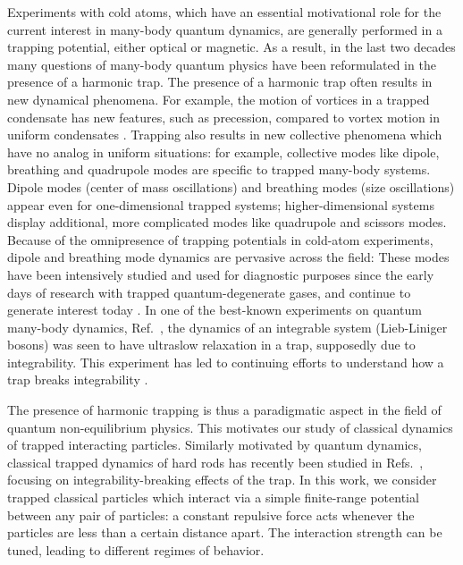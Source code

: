 \documentclass[a4paper, onecolumn]{revtex4-1}
\begin{document}
Experiments with cold atoms, which have an essential motivational role for the current interest in
many-body quantum dynamics, are generally performed in a trapping potential, either optical or
magnetic.  As a result, in the last two decades many questions of many-body quantum physics have
been reformulated in the presence of a harmonic trap.  The presence of a harmonic trap often results
in new dynamical phenomena.  For example, the motion of vortices in a trapped condensate
\cite{vortices_trappedBEC} has new features, such as precession, compared to vortex motion in
uniform condensates \cite{vortices_uniformBEC}.  Trapping also results in new collective phenomena
which have no analog in uniform situations: for example, collective modes like dipole, breathing and
quadrupole modes are specific to trapped many-body systems.  Dipole modes (center of mass
oscillations) and breathing modes (size oscillations) appear even for one-dimensional trapped
systems; higher-dimensional systems display additional, more complicated modes like quadrupole and
scissors modes.  Because of the omnipresence of trapping potentials in cold-atom experiments, dipole
and breathing mode dynamics are pervasive across the field: These modes have been intensively
studied and used for diagnostic purposes since the early days of research with trapped
quantum-degenerate gases, and continue to generate interest today
\cite{collective_modes_early_papers, PitaevskiiRosch_PRA97, Esslinger_exp_PRL2003, STG_Astrakharchik_PRL2005, 
  GrimmSmith_unitaryfermions_PRA08, OrignacCitro_PRA08, Naegerl_Science09, Wetterich_JPB2011, Mazets_1Dbreathing_EPJD11,
  fermion2Dbreathing, Tschischik_BHbreathing_PRA_2013, KroenkeSchmelcher_BM, Bouchoule_PRL2014,
  br_mode_long_range_interactions, Bonitz_Review, QuinnHaque_PRA14, Tschischik_BH_2papers,
   1D_breathing_mode_recent, Minguzzi_dipole_PRA2015, 
  Stringari_lowDcollective_PRA15,    MistakidisSchmelcher_PRA17}. 
%
In one of the best-known experiments on quantum many-body dynamics,
Ref.~\cite{NewtonsCradle_Nature06}, the dynamics of an integrable system (Lieb-Liniger bosons) was
seen to have ultraslow relaxation in a trap, supposedly due to integrability.  This experiment has
led to continuing efforts to understand how a trap breaks integrability
\cite{CauxKonik_glimmers_PRX15, CauxDoyonDubailKonik_1711, DoyonSpohn_JSTAT17, Moore_arXiv17.10}.

The presence of harmonic trapping is thus a paradigmatic aspect in the field of quantum
non-equilibrium physics.  This motivates our study of classical dynamics of trapped interacting
particles.  Similarly motivated by quantum dynamics, classical trapped dynamics of hard rods has
recently been studied in Refs.\ \cite{DoyonSpohn_JSTAT17, Moore_arXiv17.10}, focusing on
integrability-breaking effects of the trap.  In this work, we consider trapped classical particles
which interact via a simple finite-range potential between any pair of particles: a constant
repulsive force acts whenever the particles are less than a certain distance apart.  The interaction
strength can be tuned, leading to different regimes of behavior.
\end{document}
